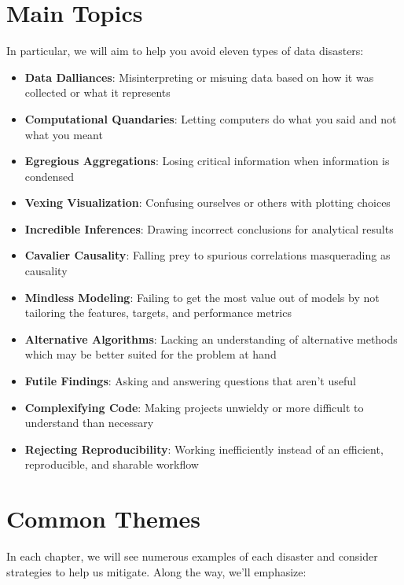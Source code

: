 \documentclass[
]{krantz}
\providecommand{\tightlist}{%
  \setlength{\itemsep}{0pt}\setlength{\parskip}{0pt}}
\begin{document}
\hypertarget{main-topics}{%
\section{Main Topics}\label{main-topics}}

In particular, we will aim to help you avoid eleven types of data disasters:

\begin{itemize}
\tightlist
\item
  \textbf{Data Dalliances}: Misinterpreting or misuing data based on how it was collected or what it represents
\item
  \textbf{Computational Quandaries}: Letting computers do what you said and not what you meant
\item
  \textbf{Egregious Aggregations}: Losing critical information when information is condensed
\item
  \textbf{Vexing Visualization}: Confusing ourselves or others with plotting choices
\item
  \textbf{Incredible Inferences}: Drawing incorrect conclusions for analytical results
\item
  \textbf{Cavalier Causality}: Falling prey to spurious correlations masquerading as causality
\item
  \textbf{Mindless Modeling}: Failing to get the most value out of models by not tailoring the features, targets, and performance metrics
\item
  \textbf{Alternative Algorithms}: Lacking an understanding of alternative methods which may be better suited for the problem at hand
\item
  \textbf{Futile Findings}: Asking and answering questions that aren't useful
\item
  \textbf{Complexifying Code}: Making projects unwieldy or more difficult to understand than necessary
\item
  \textbf{Rejecting Reproducibility}: Working inefficiently instead of an efficient, reproducible, and sharable workflow
\end{itemize}

\hypertarget{common-themes}{%
\section{Common Themes}\label{common-themes}}

In each chapter, we will see numerous examples of each disaster and consider strategies to help us mitigate.
Along the way, we'll emphasize:
\end{document}
